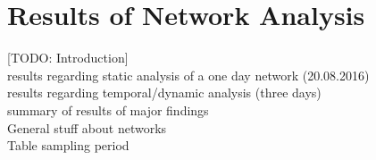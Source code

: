 \chapter{Results of Network Analysis}
\label{ch:results}

[TODO: Introduction]\\
results regarding static analysis of a one day network (20.08.2016)\\
results regarding temporal/dynamic analysis (three days)\\
summary of results of major findings\\

General stuff about networks\\
Table sampling period\\



